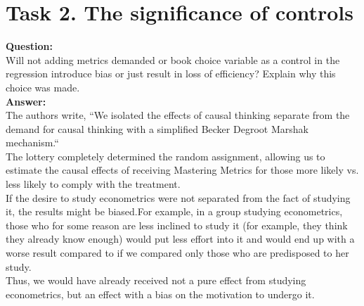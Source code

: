 \documentclass[12pt, a4paper]{article}
\begin{document}
	
	\section*{Task 2. The significance of controls}
	\textbf{Question:}\\
	Will not adding metrics demanded or book choice variable as a control in the regression introduce bias or just result in loss of efficiency? Explain why this choice was made.\\
	\textbf{Answer:}\\
	The authors write, ``We isolated the effects of causal thinking separate from the demand for causal thinking with a simplified Becker Degroot Marshak mechanism.`` \\
	The lottery completely determined the random assignment, allowing us to estimate the causal effects of receiving Mastering Metrics for those more likely vs. less likely to comply with the treatment. \\
	If the desire to study econometrics were not separated from the fact of studying it, the results might be biased.For example, in a group studying econometrics, those who for some reason are less inclined to study it (for example, they think they already know enough) would put less effort into it and would end up with a worse result compared to if we compared only those who are predisposed to her study. \\
	Thus, we would have already received not a pure effect from studying econometrics, but an effect with a bias on the motivation to undergo it.
\end{document}
